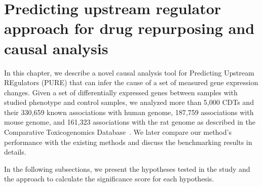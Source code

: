 \section{Predicting upstream regulator approach for drug repurposing and causal analysis}



\label{chap:PURE}



In this chapter, we describe a novel causal analysis tool for Predicting Upstream REgulators (PURE) that can infer the cause of a set of measured gene expression changes. 
Given a set of differentially expressed genes between samples with studied phenotype and control samples, we  analyzed more  than 5,000 CDTs and their 330,659 known associations with human genome, 187,759 associations with mouse genome, and 161,323 associations with the rat genome as described in the Comparative Toxicogenomics Database~\cite{mattingly2006comparative}. We later compare our method's performance with the existing methods and discuss the benchmarking results in details.
 
 
In the following subsections, we present the hypotheses tested in the study and the approach to calculate the significance score for each hypothesis.



